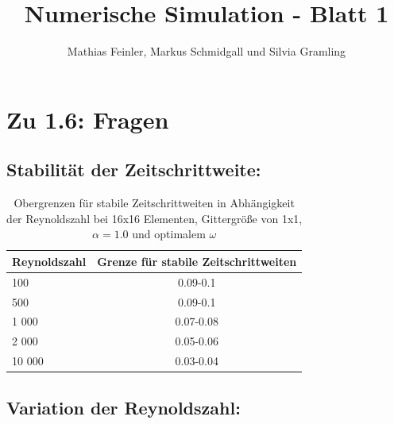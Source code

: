 \documentclass[12pt,pdftex,a4paper]{article}
\begin{document}
\newcommand{\scale}{2.36}

\title{Numerische Simulation - Blatt 1}
\author{Mathias Feinler, Markus Schmidgall und Silvia Gramling}
\maketitle

\section*{Zu 1.6: Fragen}

\subsection*{Stabilität der Zeitschrittweite:}

\begin{table}[h]
\begin{tabular}{l|c}
  Reynoldszahl & Grenze für stabile Zeitschrittweiten  \\ \hline
  100 & 0.09-0.1 \\ 
  500 & 0.09-0.1 \\
  1 000 & 0.07-0.08 \\
  2 000 & 0.05-0.06 \\
  10 000 & 0.03-0.04\\ \hline
\end{tabular}
\caption{Obergrenzen für stabile Zeitschrittweiten in Abhängigkeit der Reynoldszahl bei 16x16 Elementen, Gittergröße von 1x1, $\alpha=1.0$ und optimalem $\omega$}
\end{table}

\newpage
\subsection*{Variation der Reynoldszahl:}
\end{document}
